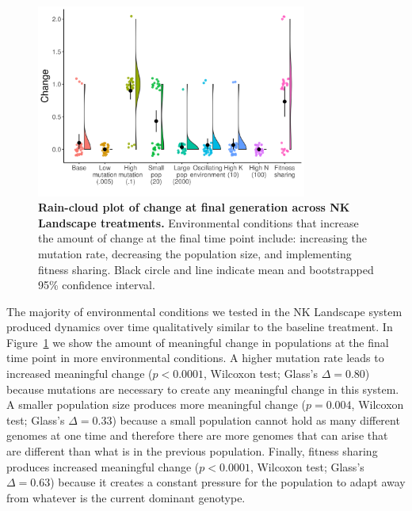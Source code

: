 \documentclass[letterpaper]{article}
\begin{document}
\begin{figure}
    \centering
\includegraphics[width=3.5in]{figs/dolson.changeboxplots.png}
\caption{\textbf{Rain-cloud plot of change at final generation across NK Landscape treatments.} Environmental conditions that increase the amount of change at the final time point include: increasing the mutation rate, decreasing the population size, and implementing fitness sharing. Black circle and line indicate mean and bootstrapped 95\% confidence interval.\label{change}}
\end{figure}


The majority of environmental conditions we tested in the NK Landscape system produced dynamics over time qualitatively similar to the baseline treatment. In Figure~\ref{change} we show the amount of meaningful change in populations at the final time point in more environmental conditions. A higher mutation rate leads to increased meaningful change ($p<0.0001$, Wilcoxon test; Glass's $\Delta=0.80$) because mutations are necessary to create any meaningful change in this system. A smaller population size produces more meaningful change ($p=0.004$, Wilcoxon test; Glass's $\Delta=0.33$) because a small population cannot hold as many different genomes at one time and therefore there are more genomes that can arise that are different than what is in the previous population. Finally, fitness sharing produces increased meaningful change ($p<0.0001$, Wilcoxon test; Glass's $\Delta=0.63$) because it creates a constant pressure for the population to adapt away from whatever is the current dominant genotype.
\end{document}
